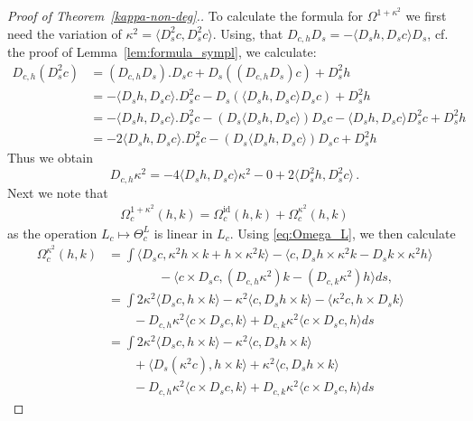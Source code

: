 \documentclass[12pt]{amsart}
\theoremstyle{definition}
\newcommand{\id}{\mathrm{id}}
\def\ka{\kappa}
\def\Th{\Theta}
\def\Om{\Omega}
\def\x{\times}
\begin{document}
\begin{proof}[Proof of Theorem~\ref{kappa-non-deg}.]
To calculate the formula for $\Omega^{1+\ka^2}$ we first need the variation of $\ka^2=\langle D_s^2 c, D_s^2 c\rangle$. Using, that $D_{c,h}D_s = -\langle D_s h, D_s c\rangle D_s$, cf. the proof of Lemma~\ref{lem:formula_sympl},
we calculate:
\begin{align}
    D_{c,h} (D_s^2 c) &= (D_{c,h}D_s).D_sc + D_s\left((D_{c,h}D_s)c\right) + D_s^2 h
    \\&
    =-\langle D_sh,D_sc\rangle.D_s^2c - D_s\left(\langle D_sh, D_sc\rangle D_sc\right) + D_s^2h\\
    &=-\langle D_sh,D_sc\rangle.D_s^2c - \left(D_s\langle D_sh, D_sc\rangle\right) D_sc -\langle D_sh, D_sc\rangle D^2_sc + D_s^2h\\
     &=-2\langle D_sh,D_sc\rangle.D_s^2c - \left(D_s\langle D_sh, D_sc\rangle\right) D_sc + D_s^2h
\end{align}
Thus we obtain
\begin{equation}\label{eq:varka2}
    D_{c,h}\ka^2 = -4\langle D_sh,D_sc\rangle \ka^2 - 0 + 2\langle D_s^2h, D_s^2c\rangle\,.
   \end{equation}
Next we note that 
\begin{align*}
    \Om^{1+\ka^2}_c(h,k) = \Om^{\id}_c(h,k)+\Om^{\kappa^2}_c(h,k)
\end{align*}
as the operation $L_c\mapsto \Th_c ^L$ is linear in $L_c$.
Using \eqref{eq:Omega_L}, we then calculate
\begin{equation}
\begin{aligned}\label{eq:presymplectic_curvature}
\Om^{\kappa^2}_c(h,k) 
    &=\int\langle D_s c, \ka^2 h \x k + h\x  \ka^2 k\rangle 
     - \langle c, D_s h \x  \ka^2 k - D_s k \x  \ka^2 h \rangle 
    \\&\qquad\qquad
     - \langle c\x D_s c, (D_{c,h} \ka^2)k - (D_{c,k} \ka^2)h\rangle ds,
     \\&=\int 2 \kappa^2 \langle D_s c, h \x k\rangle 
     - \ka^2\langle c, D_s h \x   k  \rangle - \langle \ka^2 c, h \x  D_s k\rangle 
     \\& \qquad- D_{c,h} \ka^2 \langle c\x D_s c, k \rangle +D_{c,k} \ka^2\langle c\x D_s c,h\rangle ds
     \\& =\int 2\kappa^2 \langle D_s c, h \x k\rangle 
     - \ka^2\langle c, D_s h \x   k  \rangle 
     \\&\qquad+ \langle D_s (\ka^2 c), h \x   k\rangle +\ka^2\langle c, D_s h \x   k  \rangle 
      \\& \qquad- D_{c,h} \ka^2 \langle c\x D_s c, k \rangle  + D_{c,k} \ka^2  \langle c\x D_s c,h\rangle ds

\end{aligned}
\end{equation}
\end{proof}
\end{document}
